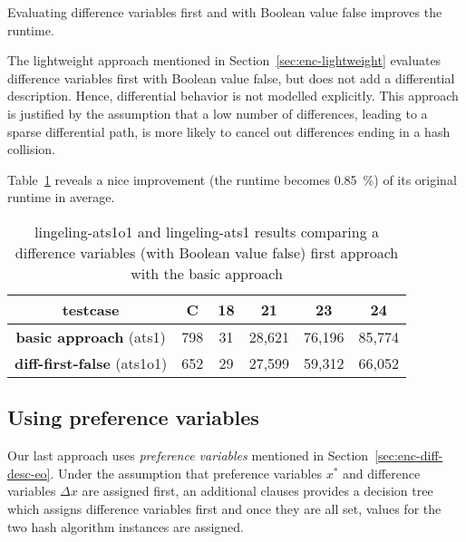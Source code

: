 \begin{prop}
  Evaluating difference variables first and with Boolean value false improves the runtime.
\end{prop}
%
The lightweight approach mentioned in Section~\ref{sec:enc-lightweight}
evaluates difference variables first with Boolean value false,
but does not add a differential description. Hence, differential behavior is
not modelled explicitly.
This approach is justified by the assumption that a low number of differences,
leading to a sparse differential path, is more likely to cancel out differences
ending in a hash collision.

Table~\ref{tab:diff-first-false-results} reveals a nice improvement (the runtime
becomes 0.85~\%) of its original runtime in average.

\begin{table}[!h]
  \begin{center}
    \begin{tabular}{c|c|cccc}
      \textbf{testcase}                   & \textbf{C} & \textbf{18} & \textbf{21} & \textbf{23} & \textbf{24} \\
    \hline
      \textbf{basic approach}      (ats1) &        798 &          31 &      28,621 &      76,196 &      85,774 \\
      \textbf{diff-first-false}  (ats1o1) &        652 &          29 &      27,599 &      59,312 &      66,052
    \end{tabular}
    \caption[Difference variables first (with Boolean value false) results]{
      lingeling-ats1o1 and lingeling-ats1 results
      comparing a difference variables (with Boolean value false) first approach
      with the basic approach
    }
    \label{tab:diff-first-false-results}
  \end{center}
\end{table}

\subsection{Using preference variables}
\label{sec:preference-variables}
%
Our last approach uses \emph{preference variables} mentioned in
Section~\ref{sec:enc-diff-desc-eo}. Under the assumption that
preference variables $x^*$ and difference variables $\Delta x$
are assigned first, an additional clauses provides a decision tree
which assigns difference variables first and once they are all set,
values for the two hash algorithm instances are assigned.


